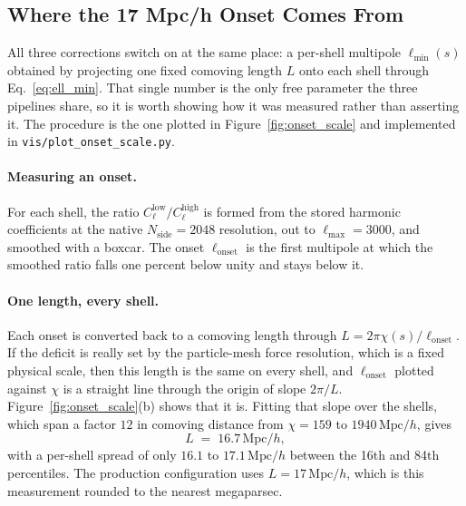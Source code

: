 \documentclass{report}
\begin{document}
\subsection{Where the 17 Mpc/h Onset Comes From}
\label{sec:res-onset}

All three corrections switch on at the same place: a per-shell multipole
\mbox{$\ell_{\min}(s)$} obtained by projecting one fixed comoving length \mbox{$L$} onto
each shell through Eq.~\eqref{eq:ell_min}. That single number is the only free parameter
the three pipelines share, so it is worth showing how it was measured rather than
asserting it. The procedure is the one plotted in Figure~\ref{fig:onset_scale} and
implemented in \texttt{vis/plot\_onset\_scale.py}.

\paragraph{Measuring an onset.} For each shell, the ratio
\mbox{$C_\ell^{\mathrm{low}}/C_\ell^{\mathrm{high}}$} is formed from the stored harmonic
coefficients at the native \mbox{$N_{\mathrm{side}}=2048$} resolution, out to
\mbox{$\ell_{\max}=3000$}, and smoothed with a boxcar. The onset
\mbox{$\ell_{\mathrm{onset}}$} is the first multipole at which the smoothed ratio falls one percent below unity and stays below it.

\paragraph{One length, every shell.} Each onset is converted back to a
comoving length through \mbox{$L = 2\pi\chi(s)/\ell_{\mathrm{onset}}$}. If the deficit is
really set by the particle-mesh force resolution, which is a fixed physical scale, then
this length is the same on every shell, and \mbox{$\ell_{\mathrm{onset}}$} plotted against
\mbox{$\chi$} is a straight line through the origin of slope \mbox{$2\pi/L$}.
Figure~\ref{fig:onset_scale}(b) shows that it is. Fitting that slope over the shells, which span a factor \mbox{$12$} in comoving distance from
\mbox{$\chi = 159$} to \mbox{$1940\,\mathrm{Mpc}/h$}, gives
\begin{equation}
  L \;=\; 16.7\,\mathrm{Mpc}/h ,
  \label{eq:onset_L}
\end{equation}
with a per-shell spread of only \mbox{$16.1$} to \mbox{$17.1\,\mathrm{Mpc}/h$} between
the 16th and 84th percentiles. The production configuration uses
\mbox{$L = 17\,\mathrm{Mpc}/h$}, which is this measurement rounded to the nearest
megaparsec.
\end{document}

